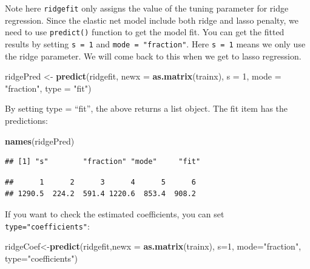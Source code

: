 \documentclass[12pt,]{krantz}
\makeatletter
\newenvironment{Shaded}{\begin{snugshade}}{\end{snugshade}}
\newcommand{\DataTypeTok}[1]{\textcolor[rgb]{0.27,0.27,0.27}{#1}}
\newcommand{\DecValTok}[1]{\textcolor[rgb]{0.06,0.06,0.06}{#1}}
\newcommand{\KeywordTok}[1]{\textcolor[rgb]{0.27,0.27,0.27}{\textbf{#1}}}
\newcommand{\NormalTok}[1]{#1}
\newcommand{\OperatorTok}[1]{\textcolor[rgb]{0.43,0.43,0.43}{\textbf{#1}}}
\newcommand{\StringTok}[1]{\textcolor[rgb]{0.5,0.5,0.5}{#1}}
\newenvironment{kframe}{%
\medskip{}
\setlength{\fboxsep}{.8em}
 \def\at@end@of@kframe{}%
 \ifinner\ifhmode%
  \def\at@end@of@kframe{\end{minipage}}%
  \begin{minipage}{\columnwidth}%
 \fi\fi%
 \def\FrameCommand##1{\hskip\@totalleftmargin \hskip-\fboxsep
 \colorbox{shadecolor}{##1}\hskip-\fboxsep
     \hskip-\linewidth \hskip-\@totalleftmargin \hskip\columnwidth}%
 \MakeFramed {\advance\hsize-\width
   \@totalleftmargin\z@ \linewidth\hsize
   \@setminipage}}%
 {\par\unskip\endMakeFramed%
 \at@end@of@kframe}
\renewenvironment{Shaded}{\begin{kframe}}{\end{kframe}}
\makeatother
\begin{document}
Note here \texttt{ridgefit} only assigns the value of the tuning parameter for ridge regression. Since the elastic net model include both ridge and lasso penalty, we need to use \texttt{predict()} function to get the model fit. You can get the fitted results by setting \texttt{s\ =\ 1} and \texttt{mode\ =\ "fraction"}. Here \texttt{s\ =\ 1} means we only use the ridge parameter. We will come back to this when we get to lasso regression.

\begin{Shaded}
\begin{Highlighting}[]
\NormalTok{ridgePred <-}\StringTok{ }\KeywordTok{predict}\NormalTok{(ridgefit, }\DataTypeTok{newx =} \KeywordTok{as.matrix}\NormalTok{(trainx), }
                     \DataTypeTok{s =} \DecValTok{1}\NormalTok{, }\DataTypeTok{mode =} \StringTok{"fraction"}\NormalTok{, }\DataTypeTok{type =} \StringTok{"fit"}\NormalTok{)}
\end{Highlighting}
\end{Shaded}

By setting type = ``fit'', the above returns a list object. The fit item has the predictions:

\begin{Shaded}
\begin{Highlighting}[]
\KeywordTok{names}\NormalTok{(ridgePred)}
\end{Highlighting}
\end{Shaded}

\begin{verbatim}
## [1] "s"        "fraction" "mode"     "fit"
\end{verbatim}

\begin{Shaded}
\end{Shaded}

\begin{verbatim}
##      1      2      3      4      5      6 
## 1290.5  224.2  591.4 1220.6  853.4  908.2
\end{verbatim}

If you want to check the estimated coefficients, you can set \texttt{type="coefficients"}:

\begin{Shaded}
\begin{Highlighting}[]
\NormalTok{ridgeCoef<-}\KeywordTok{predict}\NormalTok{(ridgefit,}\DataTypeTok{newx =} \KeywordTok{as.matrix}\NormalTok{(trainx), }
                   \DataTypeTok{s=}\DecValTok{1}\NormalTok{, }\DataTypeTok{mode=}\StringTok{"fraction"}\NormalTok{, }\DataTypeTok{type=}\StringTok{"coefficients"}\NormalTok{)}
\end{Highlighting}
\end{Shaded}
\end{document}
